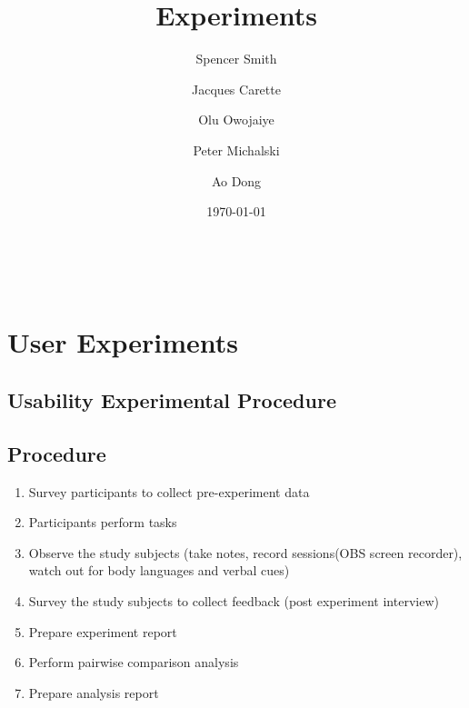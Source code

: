 \documentclass[letterpaper,cleveref]{lipics-v2019}
\title{Experiments}
\author{Spencer Smith}{McMaster University, Canada}{smiths@mcmaster.ca}{}{}
\author{Jacques Carette}{McMaster University, Canada}{carette@mcmaster.ca}{}{}
\author{Olu Owojaiye}{McMaster University, Canada}{owojaiyo@mcmaster.ca}{}{}
\author{Peter Michalski}{McMaster University, Canada}{michap@mcmaster.ca}{}{}
\author{Ao Dong}{McMaster University, Canada}{donga9@mcmaster.ca}{}{}
\date{\today}
\theoremstyle{definition}
\begin{document}
\maketitle

~\newpage
\section{User Experiments}
\subsection{Usability Experimental Procedure}

\subsection {Procedure}
\begin {enumerate}

\item Survey participants to collect pre-experiment data
\item Participants perform tasks
\item Observe the study subjects (take notes, record sessions(OBS screen recorder), watch out for body languages and verbal cues)
\item Survey the study subjects to collect feedback (post experiment interview)
\item Prepare experiment report
\item Perform pairwise comparison analysis
\item Prepare analysis report
\end {enumerate}
\end{document}
